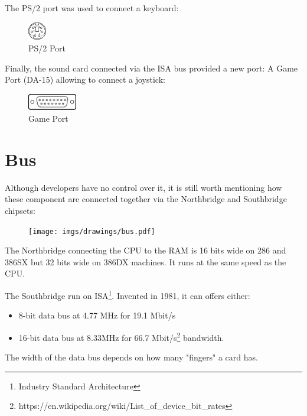 \documentclass[book.tex]{subfiles}
\begin{document}
The PS/2 port was used to connect a keyboard:
 \begin{figure}[H]
\centering
\includegraphics[width=0.07\textwidth]{imgs/drawings/ports/MiniDIN-6_PS2.eps}
\caption{PS/2 Port}
\label{fig:ps2Port}
\end{figure}


Finally, the sound card connected via the ISA bus provided a new port: A Game Port (DA-15) allowing to connect a joystick:
 \begin{figure}[H]
\centering
\includegraphics[width=0.19\textwidth]{imgs/drawings/ports/DA-15_GamePort.eps}
\caption{Game Port}
\label{fig:gamePort}
\end{figure}


\section{Bus}
Although developers have no control over it, it is still worth mentioning how these component are connected together via the Northbridge and Southbridge chipsets:\\ 
\par
\begin{figure}[H]
\centering
      \texttt{[image: imgs/drawings/bus.pdf]}
\end{figure}
\par
The Northbridge connecting the CPU to the RAM is 16 bits wide on 286 and 386SX but 32 bits wide on 386DX machines. It runs at the same speed as the CPU.\\
\par
The Southbridge run on ISA\footnote{Industry Standard Architecture}. Invented in 1981, it can offers either:
\begin{itemize}
\item 8-bit data bus at 4.77 MHz  for 19.1 Mbit/s
\item 16-bit data bus at 8.33MHz for 66.7 Mbit/s\footnote{https://en.wikipedia.org/wiki/List\_of\_device\_bit\_rates} bandwidth.
\end{itemize}
The width of the data bus depends on how many "fingers" a card has.\\
\par
\end{document}
